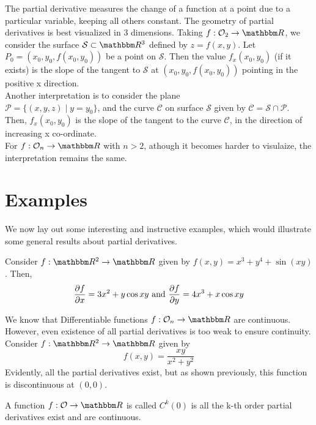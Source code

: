 \documentclass[../Analysis-3]{subfiles}
\begin{document}
The partial derivative measures the change of a function at a point due to a particular variable, keeping all others constant. The geometry of partial derivatives is best visualized in 3 dimensions. Taking $f: \mathcal{O}_2 \to \R$, we consider the surface $\mathcal{S} \subset \R^3$ defined by $z = f(x,y)$. Let $P_0 = (x_0, y_0, f(x_0, y_0))$ be a point on $\mathcal{S}$. Then the value $f_x(x_0, y_0)$ (if it exists) is the slope of the tangent to $\mathcal{S}$ at $(x_0, y_0, f(x_0, y_0))$ pointing in the positive x direction.\\
Another interpretation is to consider the plane \\
$\mathcal{P} = \{(x,y,z) \mid y = y_0\}$, and the curve $\mathcal{C}$ on surface $\mathcal{S}$ given by $\mathcal{C} = \mathcal{S} \cap \mathcal{P}$. Then, $f_x(x_0, y_0)$ is the slope of the tangent to the curve $\mathcal{C}$, in the direction of increasing x co-ordinate.\\
For $f: \mathcal{O}_n \to \R$ with $n > 2$, athough it becomes harder to visulaize, the interpretation remains the same.

\newpage

\section{Examples}

We now lay out some interesting and instructive examples, which would illustrate some general results about partial derivatives.

\begin{Eg}{}{}
        Consider $f: \R^2 \to \R$ given by $f(x,y) = x^3 + y^4 + \sin(xy)$. Then,
        $$\pdv{f}{x} = 3x^2 + y\cos{xy} \text{ and } \pdv{f}{y} = 4x^3 + x\cos{xy}$$
\end{Eg}

\begin{Eg}{}{}
    We know that Differentiable functions  $f: \mathcal{O}_n \to \R$ are continuous. However, even existence of all partial derivatives is too weak to ensure continuity.\\
    Consider $f: \R^2 \to \R$ given by 
    $$f(x,y) = \frac{xy}{x^2 + y^2}$$
    Evidently, all the partial derivatives exist, but as shown previously, this function is discontinuous at $(0,0)$.
\end{Eg}

\begin{Def}{}{}
    A function $f: \mathcal{O} \to \R$ is called $C^k(\mathcal{0})$ is all the k-th order partial derivatives exist and are continuous.
\end{Def}
\end{document}
